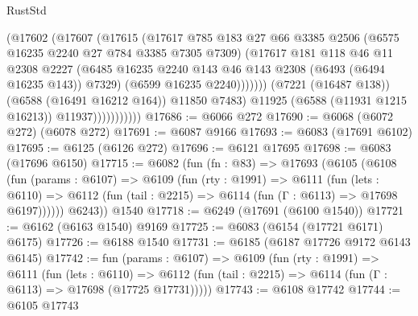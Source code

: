 \begin{lexlean}{RustStd}
\begin{coremodule}
                              (@17602
                                (@17607
                                  (@17615
                                    (@17617
                                      @785
                                      @183
                                      @27
                                      @66
                                      @3385
                                      @2506
                                      (@6575 @16235 @2240 @27 @784 @3385 @7305 @7309)
                                      (@17617
                                        @181
                                        @118
                                        @46
                                        @11
                                        @2308
                                        @2227
                                        (@6485
                                          @16235
                                          @2240
                                          @143
                                          @46
                                          @143
                                          @2308
                                          (@6493 (@6494 @16235 @143))
                                          @7329)
                                        (@6599 @16235 @2240)))))))
                            (@7221 (@16487 @138))
                            (@6588 (@16491 @16212 @164))
                            @11850
                            @7483)
                          @11925
                          (@6588 (@11931 @1215 @16213))
                          @11937)))))))))))
@17686 := @6066 @272
@17690 := @6068 (@6072 @272) (@6078 @272)
@17691 := @6087 @9166
@17693 := @6083 (@17691 @6102)
@17695 := @6125 (@6126 @272)
@17696 := @6121 @17695
@17698 := @6083 (@17696 @6150)
@17715 := @6082
    (fun (fn : @83) =>
    @17693
      (@6105
        (@6108
          (fun (params : @6107) =>
          @6109
            (fun (rty : @1991) =>
            @6111
              (fun (lets : @6110) =>
              @6112 (fun (tail : @2215) => @6114 (fun (Γ : @6113) => @17698 @6197))))))
        @6243))
    @1540
@17718 := @6249 (@17691 (@6100 @1540))
@17721 := @6162 (@6163 @1540) @9169
@17725 := @6083 (@6154 (@17721 @6171) @6175)
@17726 := @6188 @1540
@17731 := @6185 (@6187 @17726 @9172 @6143 @6145)
@17742 := fun (params : @6107) =>
  @6109
    (fun (rty : @1991) =>
    @6111
      (fun (lets : @6110) =>
      @6112 (fun (tail : @2215) => @6114 (fun (Γ : @6113) => @17698 (@17725 @17731)))))
@17743 := @6108 @17742
@17744 := @6105 @17743

\end{coremodule}
\end{lexlean}
